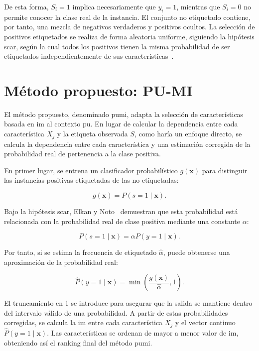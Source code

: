 De esta forma, $S_i=1$ implica necesariamente que $y_i=1$, mientras que $S_i=0$ no permite conocer la clase real de la instancia. El conjunto no etiquetado contiene, por tanto, una mezcla de negativos verdaderos y positivos ocultos. La selección de positivos etiquetados se realiza de forma aleatoria uniforme, siguiendo la hipótesis \acrshort{scar}, según la cual todos los positivos tienen la misma probabilidad de ser etiquetados independientemente de sus características~\cite{elkan2008learning}.

\section{Método propuesto: PU-MI}
\label{sec:metodo_propuesto}

El método propuesto, denominado \acrshort{pumi}, adapta la selección de características basada en \acrshort{im} al contexto \acrshort{pu}. En lugar de calcular la dependencia entre cada característica $X_j$ y la etiqueta observada $S$, como haría un enfoque directo, se calcula la dependencia entre cada característica y una estimación corregida de la probabilidad real de pertenencia a la clase positiva.

En primer lugar, se entrena un clasificador probabilístico $g(\mathbf{x})$ para distinguir las instancias positivas etiquetadas de las no etiquetadas:

\begin{equation}
g(\mathbf{x}) = P(s=1 \mid \mathbf{x}).
\label{eq:g_pu}
\end{equation}

Bajo la hipótesis \acrshort{scar}, Elkan y Noto~\cite{elkan2008learning} demuestran que esta probabilidad está relacionada con la probabilidad real de clase positiva mediante una constante $\alpha$:

\begin{equation}
P(s=1 \mid \mathbf{x}) = \alpha P(y=1 \mid \mathbf{x}).
\label{eq:relacion_pu}
\end{equation}

Por tanto, si se estima la frecuencia de etiquetado $\hat{\alpha}$, puede obtenerse una aproximación de la probabilidad real:

\begin{equation}
\hat{P}(y=1 \mid \mathbf{x}) =
\min\left(
\frac{g(\mathbf{x})}{\hat{\alpha}},
1
\right).
\label{eq:prob_corregida}
\end{equation}

El truncamiento en 1 se introduce para asegurar que la salida se mantiene dentro del intervalo válido de una probabilidad. A partir de estas probabilidades corregidas, se calcula la \acrshort{im} entre cada característica $X_j$ y el vector continuo $\hat{P}(y=1 \mid \mathbf{x})$. Las características se ordenan de mayor a menor valor de \acrshort{im}, obteniendo así el ranking final del método \acrshort{pumi}.

